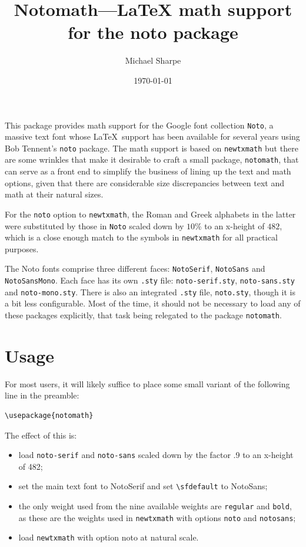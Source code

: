 \documentclass[]{article}
\title{Notomath---LaTeX math support for the noto package}
\author{Michael Sharpe}
\date{\today}  %
\begin{document}
\maketitle

This package provides math support for the Google font collection {\tt Noto}, a massive text font whose \LaTeX\ support has been available for several years using Bob Tennent's {\tt noto} package. The math support is based on {\tt newtxmath} but there are some wrinkles that make it desirable to craft a small package, {\tt notomath}, that can serve as a front end to simplify the business of lining up the text and math options, given that there are considerable size discrepancies between text and math at their natural sizes. 

For the {\tt noto} option to {\tt newtxmath}, the Roman and Greek alphabets in the latter were substituted by those in {\tt Noto} scaled down by $10$\% to an x-height of $482$, which is a close enough match to the symbols in {\tt newtxmath} for all practical purposes. 

The Noto fonts comprise three different faces: {\tt NotoSerif}, {\tt NotoSans} and {\tt NotoSansMono}. Each face has its own {\tt.sty} file: {\tt noto-serif.sty}, {\tt noto-sans.sty} and {\tt noto-mono.sty}. There is also an integrated {\tt.sty} file, {\tt noto.sty}, though it is a bit less configurable. Most of the time, it should not be necessary to load any of these packages explicitly, that task being relegated to the package {\tt notomath}.


\section*{Usage}
For most users, it will likely suffice to place some small variant of the following line in the preamble:
\begin{verbatim}
\usepackage{notomath}
\end{verbatim}
The effect of this is:
\begin{itemize}
\item
load {\tt noto-serif} and {\tt noto-sans} scaled down by the factor .9 to an x-height of 482;
\item set the main text font to NotoSerif and set \verb|\sfdefault| to 
NotoSans;
\item the only weight used from the nine available weights are {\tt regular} and {\tt bold}, as these are the weights used in {\tt newtxmath} with options {\tt noto} and {\tt notosans};
\item load {\tt newtxmath} with option {noto} at natural scale.
\end{itemize}
\end{document}
